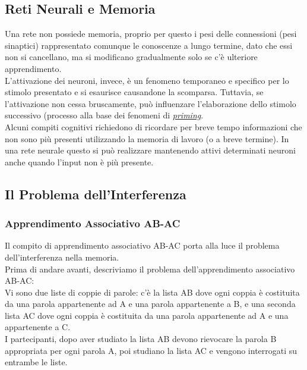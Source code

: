 \documentclass[12pt, a4paper]{article}
\begin{document}
\subsection{Reti Neurali e Memoria}
Una rete non possiede memoria, proprio per questo i pesi delle connessioni (pesi sinaptici) rappresentato comunque le conoscenze a lungo termine, dato che essi non si cancellano, ma si modificano gradualmente solo se c'è ulteriore apprendimento.\\
L'attivazione dei neuroni, invece, è un fenomeno temporaneo e specifico per lo stimolo presentato e si esaurisce causandone la scomparsa. Tuttavia, se l'attivazione non cessa bruscamente, può influenzare l'elaborazione dello stimolo successivo (processo alla base dei fenomeni di \href{https://it.wikipedia.org/wiki/Priming_(psicologia)}{\textit{priming}}.\\
Alcuni compiti cognitivi richiedono di ricordare per breve tempo informazioni che non sono più presenti utilizzando la memoria di lavoro (o a breve termine). In una rete neurale questo si può realizzare mantenendo attivi determinati neuroni anche quando l'input non è più presente.

\subsection{Il Problema dell'Interferenza}
\subsubsection{Apprendimento Associativo AB-AC}
Il compito di apprendimento associativo AB-AC porta alla luce il problema dell'interferenza nella memoria.\\
Prima di andare avanti, descriviamo il problema dell'apprendimento associativo AB-AC:\\
Vi sono due liste di coppie di parole: c'è la lista AB dove ogni coppia è costituita da una parola appartenente ad A e una parola appartenente a B, e una seconda lista AC dove ogni coppia è costituita da una parola appartenente ad A e una appartenente a C.\\
I partecipanti, dopo aver studiato la lista AB devono rievocare la parola B appropriata per ogni parola A, poi studiano la lista AC e vengono interrogati su entrambe le liste.
\end{document}
